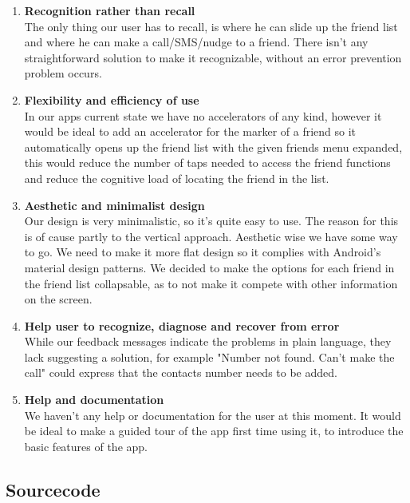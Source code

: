 \documentclass[runningheads,a4paper]{llncs}
\begin{document}
\begin{enumerate}
\item \textbf{Recognition rather than recall}\\
The only thing our user has to recall, is where he can slide up the friend list and where he can make a call/SMS/nudge to a friend. There isn’t any straightforward solution to make it recognizable, without an error prevention problem occurs.
\item \textbf{Flexibility and efficiency of use}\\
In our apps current state we have no accelerators of any kind, however it would be ideal to add an accelerator for the marker of a friend so it automatically opens up the friend list with the given friends menu expanded, this would reduce the number of taps needed to access the friend functions and reduce the cognitive load of locating the friend in the list.
\item \textbf{Aesthetic and minimalist design
}\\
Our design is very minimalistic, so it’s quite easy to use. The reason for this is of cause partly to the vertical approach. 
Aesthetic wise we have some way to go. We need to make it more flat design so it complies with Android's material design patterns.
We decided to make the options for each friend in the friend list collapsable, as to not make it compete with other information on the screen.
\item \textbf{Help user to recognize, diagnose and recover from error}\\
While our feedback messages indicate the problems in plain language, they lack suggesting a solution, for example "Number not found. Can't make the call" could express that the contacts number needs to be added.
\item \textbf{Help and documentation}\\
We haven’t any help or documentation for the user at this moment. It would be ideal to make a guided tour of the app first time using it, to introduce the basic features of the app. 


\end{enumerate}


\subsection*{Sourcecode}
\lstset{numbers=left,
tabsize=2, numbersep=10pt,
  title=\lstname }

\end{document}
